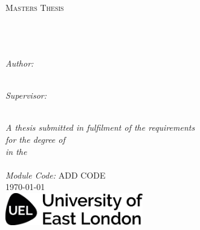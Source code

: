 \documentclass[11pt, oneside]{Thesis} %
\begin{document}
\begin{titlepage}
\begin{center}

\textsc{\LARGE \univname}\\[1.5cm] %
\textsc{\Large Masters Thesis}\\[0.5cm] %

\HRule \\[0.4cm] %
{\huge \bfseries \ttitle}\\[0.4cm] %
\HRule \\[1.5cm] %
 
\begin{minipage}{0.4\textwidth}
\begin{flushleft} \large
\emph{Author:}\\
\href{https://www.uel.ac.uk}{\authornames} \\%
\end{flushleft}
\end{minipage}
\begin{minipage}{0.4\textwidth}
\begin{flushright} \large
\emph{Supervisor:} \\
\href{https://www.uel.ac.uk}{\supname} %
\end{flushright}
\end{minipage}\\[3cm]
 
\large \textit{A thesis submitted in fulfilment of the requirements\\ for the degree of \degreename}\\[0.3cm] %
\textit{in the}\\[0.4cm]

\deptname\\[2cm] %
\emph{Module Code:} ADD CODE\\
{\large \today}\\[1cm] %
\includegraphics[width=6cm]{./Images/UELlogo.png} %
 
\vfill
\end{center}

\end{titlepage}
\end{document}
